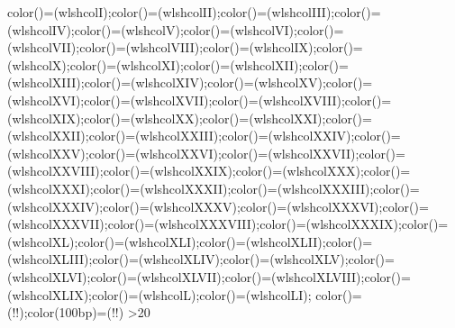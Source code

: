 {{            color(\xI)=(wlshcolI);color(\xII)=(wlshcolII);color(\xIII)=(wlshcolIII);color(\xIV)=(wlshcolIV);color(\xV)=(wlshcolV);color(\xVI)=(wlshcolVI);color(\xVII)=(wlshcolVII);color(\xVIII)=(wlshcolVIII);color(\xIX)=(wlshcolIX);color(\xX)=(wlshcolX);color(\xXI)=(wlshcolXI);color(\xXII)=(wlshcolXII);color(\xXIII)=(wlshcolXIII);color(\xXIV)=(wlshcolXIV);color(\xXV)=(wlshcolXV);color(\xXVI)=(wlshcolXVI);color(\xXVII)=(wlshcolXVII);color(\xXVIII)=(wlshcolXVIII);color(\xXIX)=(wlshcolXIX);color(\xXX)=(wlshcolXX);color(\xXXI)=(wlshcolXXI);color(\xXXII)=(wlshcolXXII);color(\xXXIII)=(wlshcolXXIII);color(\xXXIV)=(wlshcolXXIV);color(\xXXV)=(wlshcolXXV);color(\xXXVI)=(wlshcolXXVI);color(\xXXVII)=(wlshcolXXVII);color(\xXXVIII)=(wlshcolXXVIII);color(\xXXIX)=(wlshcolXXIX);color(\xXXX)=(wlshcolXXX);color(\xXXXI)=(wlshcolXXXI);color(\xXXXII)=(wlshcolXXXII);color(\xXXXIII)=(wlshcolXXXIII);color(\xXXXIV)=(wlshcolXXXIV);color(\xXXXV)=(wlshcolXXXV);color(\xXXXVI)=(wlshcolXXXVI);color(\xXXXVII)=(wlshcolXXXVII);color(\xXXXVIII)=(wlshcolXXXVIII);color(\xXXXIX)=(wlshcolXXXIX);color(\xXL)=(wlshcolXL);color(\xXLI)=(wlshcolXLI);color(\xXLII)=(wlshcolXLII);color(\xXLIII)=(wlshcolXLIII);color(\xXLIV)=(wlshcolXLIV);color(\xXLV)=(wlshcolXLV);color(\xXLVI)=(wlshcolXLVI);color(\xXLVII)=(wlshcolXLVII);color(\xXLVIII)=(wlshcolXLVIII);color(\xXLIX)=(wlshcolXLIX);color(\xL)=(wlshcolL);color(\xLI)=(wlshcolLI);%
            color(\pgfspectra@X@IR)=(\pgfspectra@IRcolor!\@pgfspectra@shade@opacity!\pgfspectra@shade@opacitycolor);color(100bp)=(\pgfspectra@IRcolor!\@pgfspectra@shade@opacity!\pgfspectra@shade@opacitycolor)}%
        \else%
            \edef\pgfspectra@shade@VIS@amp@int{\pgfmathresult}%
            \ifpgfspectra@logshade%
                \ifnum{}\relax\edef\pgfspectra@shadebegin{0.00001}\fi%
                \ifnum\pgfspectra@shade@VIS@amp@int>20\relax%
}
